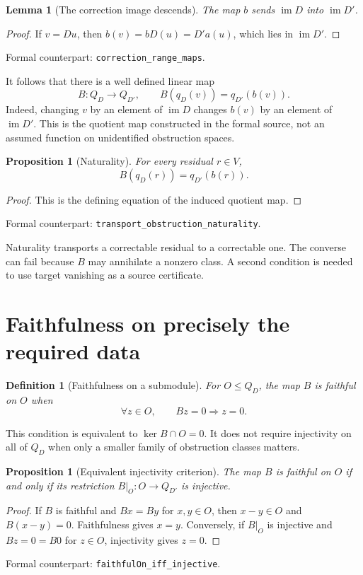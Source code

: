 \documentclass[11pt,letterpaper,oneside,openany]{book}
\theoremstyle{quiet}
\newtheorem{proposition}[theorem]{Proposition}
\newtheorem{lemma}[theorem]{Lemma}
\newtheorem{definition}[theorem]{Definition}
\DeclareMathOperator{\im}{im}
\newcommand{\formal}[1]{\par\nobreak\begingroup\footnotesize\color{Slate}\sffamily Formal counterpart: \normalfont\nolinkurl{#1}.\par\endgroup}
\begin{document}
\begin{lemma}[The correction image descends]\label{lem:range-maps}
The map $b$ sends $\im D$ into $\im D'$.
\end{lemma}
\begin{proof}
If $v=Du$, then $b(v)=bD(u)=D'a(u)$, which lies in $\im D'$.
\end{proof}
\formal{correction_range_maps}

It follows that there is a well defined linear map
\[
B:Q_D\longrightarrow Q_{D'},\qquad B(q_D(v))=q_{D'}(b(v)).
\]
Indeed, changing $v$ by an element of $\im D$ changes $b(v)$ by an element of $\im D'$. This is the quotient map constructed in the formal source, not an assumed function on unidentified obstruction spaces.

\begin{proposition}[Naturality]\label{prop:naturality}
For every residual $r\in V$,
\begin{equation}\label{eq:naturality}
B(q_D(r))=q_{D'}(b(r)).
\end{equation}
\end{proposition}
\begin{proof}
This is the defining equation of the induced quotient map.
\end{proof}
\formal{transport_obstruction_naturality}

Naturality transports a correctable residual to a correctable one. The converse can fail because $B$ may annihilate a nonzero class. A second condition is needed to use target vanishing as a source certificate.

\section{Faithfulness on precisely the required data}
\begin{definition}[Faithfulness on a submodule]\label{def:faithful}
For $O\leq Q_D$, the map $B$ is \emph{faithful on $O$} when
\[
\forall z\in O,\qquad Bz=0\Longrightarrow z=0.
\]
\end{definition}

This condition is equivalent to $\ker B\cap O=0$. It does not require injectivity on all of $Q_D$ when only a smaller family of obstruction classes matters.

\begin{proposition}[Equivalent injectivity criterion]\label{prop:faithful-inj}
The map $B$ is faithful on $O$ if and only if its restriction $B\vert_O:O\to Q_{D'}$ is injective.
\end{proposition}
\begin{proof}
If $B$ is faithful and $Bx=By$ for $x,y\in O$, then $x-y\in O$ and $B(x-y)=0$. Faithfulness gives $x=y$. Conversely, if $B\vert_O$ is injective and $Bz=0=B0$ for $z\in O$, injectivity gives $z=0$.
\end{proof}
\formal{faithfulOn_iff_injective}
\end{document}
